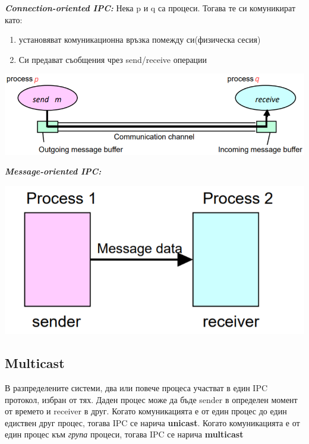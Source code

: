 \documentclass[11pt]{article} %
\begin{document}
\textit{\textbf{Connection-oriented IPC: }} Нека p и q са процеси. Тогава те си комуникират като:
\begin{enumerate}[noitemsep]
	\item установяват комуникационна връзка помежду си(физическа сесия)
	\item Си предават съобщения чрез send/receive операции\\
\end{enumerate}
\begin{center}
	\includegraphics[scale=0.5]{ConnectionOrientedIPC.png} 
\end{center}
\newpage
\textit{\textbf{Message-oriented IPC: }}\\
\begin{center}
	\includegraphics[scale=0.5]{MessageOrientedIPC.png} 
\end{center}

\subsection{Multicast}
В разпределените системи, два или повече процеса участват в един IPC протокол, избран от тях. Даден процес може да бъде sender в определен момент от времето и receiver в друг. Когато комуникацията е от един процес до един едиствен друг процес, тогава IPC се нарича \textbf{unicast}. Когато комуникацията е от един процес към \textit{група} процеси, тогава IPC се нарича \textbf{multicast}
\end{document}
